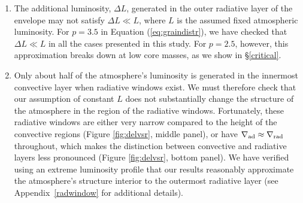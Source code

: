 \documentclass[apj]{emulateapj}
\newcommand{\delad}{\nabla_{\rm ad}}
\newcommand{\delrad}{\nabla_{\rm rad}}
\newcommand{\App}[1]{Appendix~\ref{#1}}
\begin{document}
\begin{enumerate}

 \item The additional luminosity, $\Delta L$, generated in the outer radiative layer of the envelope may not satisfy $\Delta L \ll L$, where $L$ is the assumed fixed atmospheric luminosity. For $p=3.5$ in Equation (\ref{eq:graindistr}), we have checked that $\Delta L \ll L$ in all the cases presented in this study. For $p=2.5$, however, this approximation breaks down at low core masses, as we show in \S\ref{critical}.
 
  


\item Only about half of the atmosphere's luminosity is generated in the innermost convective layer when radiative windows exist.   We must therefore check that our assumption of constant $L$ does not substantially change the structure of the atmosphere in the region of the radiative windows. Fortunately, these radiative windows are either very narrow compared to the height of the convective regions (Figure \ref{fig:delvsr}, middle panel), or  have $\delad \approx \delrad$ throughout, which makes the distinction between convective and radiative layers less  pronounced (Figure \ref{fig:delvsr}, bottom panel). We have verified using an extreme luminosity profile that our results reasonably approximate the atmosphere's structure interior to the outermost radiative layer (see \App{radwindow} for additional details).



\end{enumerate}
\end{document}
